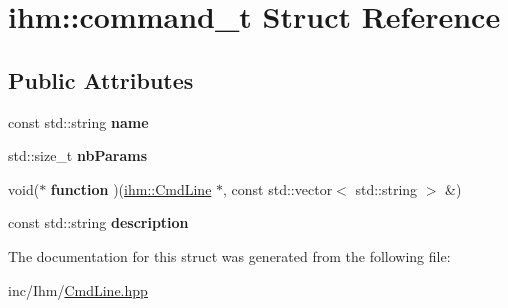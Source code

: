 \hypertarget{structihm_1_1command__t}{}\section{ihm\+:\+:command\+\_\+t Struct Reference}
\label{structihm_1_1command__t}
\subsection*{Public Attributes}
\begin{DoxyCompactItemize}
\item 
\mbox{\label{structihm_1_1command__t_a75af4a126696cfe61d9a615f8c20ec1a}} 
const std\+::string {\bfseries name}
\item 
\mbox{\label{structihm_1_1command__t_ab6f55432fe6a0c9ad3135b44d8fb0202}} 
std\+::size\+\_\+t {\bfseries nb\+Params}
\item 
\mbox{\label{structihm_1_1command__t_aa55ed142ffecd3c49fc1f20fa88b74fc}} 
void($\ast$ {\bfseries function} )(\hyperlink{classihm_1_1CmdLine}{ihm\+::\+Cmd\+Line} $\ast$, const std\+::vector$<$ std\+::string $>$ \&)
\item 
\mbox{\label{structihm_1_1command__t_aebbf502a321be7cf5d0f4fbf8caa2148}} 
const std\+::string {\bfseries description}
\end{DoxyCompactItemize}


The documentation for this struct was generated from the following file\+:\begin{DoxyCompactItemize}
\item 
inc/\+Ihm/\hyperlink{CmdLine_8hpp}{Cmd\+Line.\+hpp}\end{DoxyCompactItemize}

